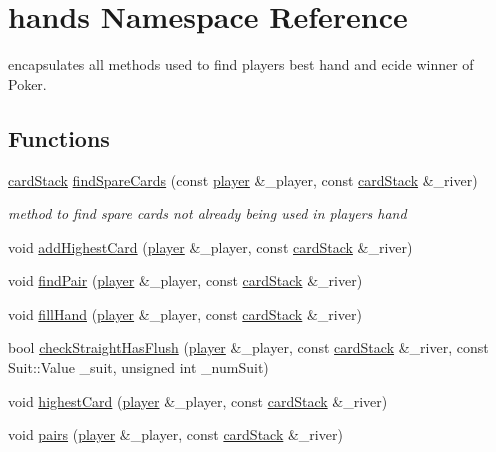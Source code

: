 \hypertarget{namespacehands}{\section{hands Namespace Reference}
\label{namespacehands}
}


encapsulates all methods used to find players best hand and ecide winner of Poker.  


\subsection*{Functions}
\begin{DoxyCompactItemize}
\item 
\hyperlink{classcardStack}{card\-Stack} \hyperlink{namespacehands_a0d09bd6ca9e5b63f66ed66ccd9df34ab}{find\-Spare\-Cards} (const \hyperlink{classplayer}{player} \&\-\_\-player, const \hyperlink{classcardStack}{card\-Stack} \&\-\_\-river)
\begin{DoxyCompactList}\small\item\em method to find spare cards not already being used in players hand \end{DoxyCompactList}\item 
void \hyperlink{namespacehands_a352ccbaca5c71fdccbefbfe4daceb122}{add\-Highest\-Card} (\hyperlink{classplayer}{player} \&\-\_\-player, const \hyperlink{classcardStack}{card\-Stack} \&\-\_\-river)
\item 
void \hyperlink{namespacehands_acb821259e4d0fc9e34539618a7332a97}{find\-Pair} (\hyperlink{classplayer}{player} \&\-\_\-player, const \hyperlink{classcardStack}{card\-Stack} \&\-\_\-river)
\item 
void \hyperlink{namespacehands_a976446f5c58424efbb3e7e832f3267c2}{fill\-Hand} (\hyperlink{classplayer}{player} \&\-\_\-player, const \hyperlink{classcardStack}{card\-Stack} \&\-\_\-river)
\item 
bool \hyperlink{namespacehands_a587b3f74a5e856caf2001832e04c3138}{check\-Straight\-Has\-Flush} (\hyperlink{classplayer}{player} \&\-\_\-player, const \hyperlink{classcardStack}{card\-Stack} \&\-\_\-river, const Suit\-::\-Value \-\_\-suit, unsigned int \-\_\-num\-Suit)
\item 
void \hyperlink{namespacehands_acba666e02d860de8bcb62a42d3421bb4}{highest\-Card} (\hyperlink{classplayer}{player} \&\-\_\-player, const \hyperlink{classcardStack}{card\-Stack} \&\-\_\-river)
\item 
void \hyperlink{namespacehands_a79af06da728563131bce6f3cb1f9c669}{pairs} (\hyperlink{classplayer}{player} \&\-\_\-player, const \hyperlink{classcardStack}{card\-Stack} \&\-\_\-river)

\end{DoxyCompactItemize}
